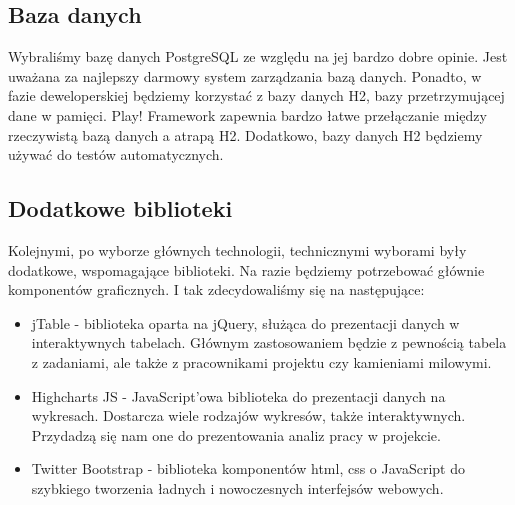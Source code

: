 \documentclass[a4paper,12pt,notitlepage]{mwrep}
\begin{document}
\subsection{Baza danych}
Wybraliśmy bazę danych PostgreSQL ze względu na jej bardzo dobre opinie. Jest uważana za najlepszy darmowy system zarządzania 
bazą danych. Ponadto, w fazie deweloperskiej będziemy korzystać z bazy danych H2, bazy przetrzymującej dane w pamięci. Play! 
Framework zapewnia bardzo łatwe przełączanie między rzeczywistą bazą danych a atrapą H2. Dodatkowo, bazy danych H2 będziemy 
używać do testów automatycznych.

\subsection{Dodatkowe biblioteki}
Kolejnymi, po wyborze głównych technologii, technicznymi wyborami były dodatkowe, wspomagające biblioteki. Na razie 
będziemy potrzebować głównie komponentów graficznych. I tak zdecydowaliśmy się na następujące:
\begin{itemize}
	\item	jTable - biblioteka oparta na jQuery, służąca do prezentacji danych w interaktywnych tabelach. Głównym 
		zastosowaniem będzie z pewnością tabela z zadaniami, ale także z pracownikami projektu czy kamieniami 
		milowymi.
	\item	Highcharts JS - JavaScript'owa biblioteka do prezentacji danych na wykresach. Dostarcza wiele rodzajów 
		wykresów, także interaktywnych. Przydadzą się nam one do prezentowania analiz pracy w projekcie.
	\item	Twitter Bootstrap - biblioteka komponentów html, css o JavaScript do szybkiego tworzenia ładnych i nowoczesnych 
		interfejsów webowych.
\end{itemize}
\end{document}
